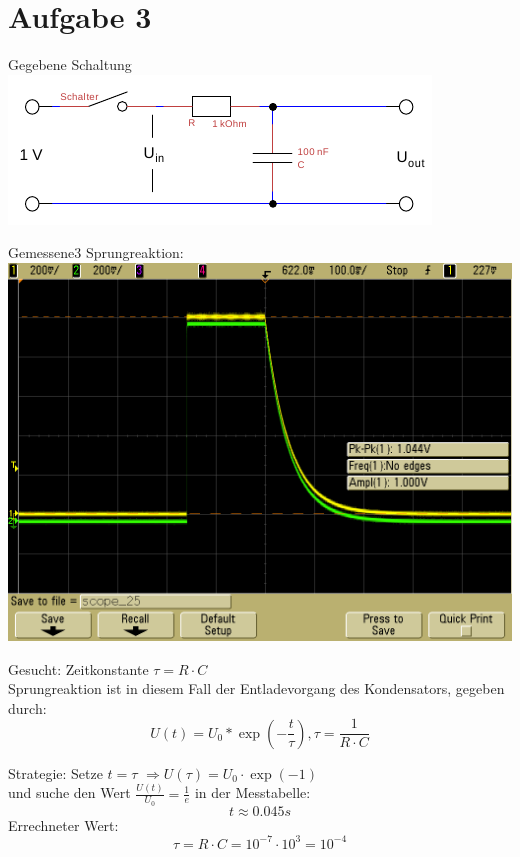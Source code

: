 \documentclass[compress,11pt]{beamer}
\begin{document}
\section{Aufgabe 3}
\begin{frame}
\begin{block}{Gegebene Schaltung}
\includegraphics[width=\textwidth]{../daten/Messdaten/plots/schalt_tief2}
\end{block}
\end{frame}
\begin{frame}
Gemessene3 Sprungreaktion:\\
\includegraphics[width=\textwidth]{../daten/scope_25}
\end{frame}
\begin{frame}
Gesucht: Zeitkonstante $\tau = R \cdot C$\\
Sprungreaktion ist in diesem Fall der Entladevorgang des Kondensators, gegeben durch:
\begin{equation}
U(t) = U_0 * \exp(-\frac{t}{\tau}),  \tau = \frac{1}{R\cdot C}
\end{equation}
\end{frame}
\begin{frame}
Strategie: Setze $t=\tau$ $\Rightarrow  U(\tau) = U_0 \cdot \exp(-1)$\\
und suche den Wert $\frac{U(t)}{U_0} = \frac{1}{e}$ in der Messtabelle:
\begin{equation}
t \approx 0.045 s
\end{equation}
Errechneter Wert:
\begin{equation}
\tau = R \cdot C = 10^{-7} \cdot 10^{3} = 10^{-4}
\end{equation}
\end{frame}
\end{document}
